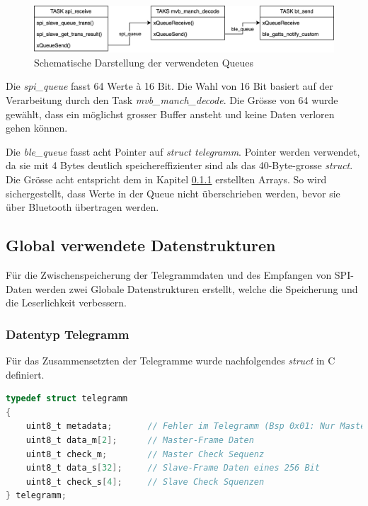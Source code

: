 \begin{figure}[H]
    \centering
    \includegraphics[width=0.9\linewidth]{Figures/Chap3/ESP/FreeRTOS/Queue.png}
    \caption{Schematische Darstellung der verwendeten Queues}
    \label{fig:QueueSchema}
\end{figure}

Die \textit{spi\_queue} fasst 64 Werte à 16 Bit. Die Wahl von 16 Bit basiert auf der Verarbeitung durch den Task \textit{mvb\_manch\_decode}. Die Grösse von 64 wurde gewählt, dass ein möglichst grosser Buffer ansteht und keine Daten verloren gehen können.

Die \textit{ble\_queue} fasst acht Pointer auf \textit{struct telegramm}. Pointer werden verwendet, da sie mit 4 Bytes deutlich speichereffizienter sind als das 40-Byte-grosse \textit{struct}. Die Grösse acht entspricht dem in Kapitel \ref{subsub:DataTelegramm} erstellten Arrays. So wird sichergestellt, dass Werte in der Queue nicht überschrieben werden, bevor sie über Bluetooth übertragen werden.

\subsection{Global verwendete Datenstrukturen}
\label{sub:GlobalDtatStruct}
Für die Zwischenspeicherung der Telegrammdaten und des Empfangen von SPI-Daten werden zwei Globale Datenstrukturen erstellt, welche die Speicherung und die Leserlichkeit verbessern. 

\subsubsection{Datentyp Telegramm}
\label{subsub:DataTelegramm}
Für das Zusammensetzten der Telegramme wurde nachfolgendes \textit{struct} in C definiert.

\begin{lstlisting}[language=C]
typedef struct telegramm
{
    uint8_t metadata;       // Fehler im Telegramm (Bsp 0x01: Nur Master-Frame)
    uint8_t data_m[2];      // Master-Frame Daten
    uint8_t check_m;        // Master Check Sequenz
    uint8_t data_s[32];     // Slave-Frame Daten eines 256 Bit
    uint8_t check_s[4];     // Slave Check Squenzen
} telegramm;
\end{lstlisting}

